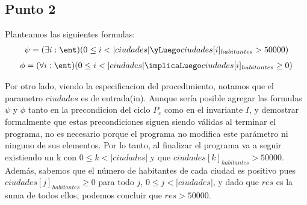 \documentclass[10pt,a4paper]{article}
\begin{document}
\subsection{Punto 2}



Planteamos las siguientes formulas:
\begin{gather*}
	\psi = (\exists i : \ent)(0 \leq i < |ciudades| \yLuego ciudades[i]_{habitantes} > 50000)
\end{gather*}
\begin{gather*}
	\phi = (\forall i : \ent)(0 \leq i < |ciudades| \implicaLuego ciudades[i]_{habitantes} \geq 0 ) 
\end{gather*} 

Por otro lado, viendo la especificacion del procedimiento, notamos que el parametro $ciudades$ es de entrada(in).
Aunque sería posible agregar las formulas $\psi$ y $\phi $ tanto en la precondicion del ciclo $P_c$ como en el invariante $I$, y demostrar formalmente que estas precondiciones siguen siendo válidas al terminar el programa, no es necesario porque el programa no modifica este parámetro ni ninguno de sus elementos. Por lo tanto, al finalizar el programa va a seguir existiendo un k con $ 0 \leq k < |ciudades|$ y que $ciudades[k]_{habitantes}> 50000$.\\

Además, sabemos que el número de habitantes de cada ciudad es positivo pues $ciudades[j]_{habitantes} \geq 0$ para todo $j$, $ 0\leq j < |ciudades|$, y dado que $res$ es la suma de todos ellos, podemos concluir que $res > 50000$.
\end{document}
